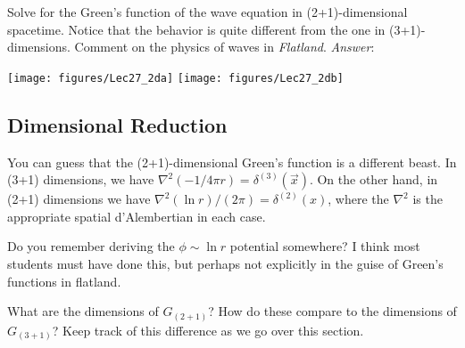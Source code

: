 \begin{exercise}
Solve for the Green's function of the wave equation in (2+1)-dimensional spacetime. Notice that the behavior is quite different from the one in (3+1)-dimensions. Comment on the physics of waves in \emph{Flatland}.
\emph{Answer}:
\begin{center}
\texttt{[image: figures/Lec27\_2da]}
\texttt{[image: figures/Lec27\_2db]}
\end{center}
\end{exercise}


\subsection{Dimensional Reduction}

You can guess that the (2+1)-dimensional Green's function is a different beast. In (3+1) dimensions, we have $\nabla^2 (-1/4\pi r) = \delta^{(3)}(\vec{x})$. On the other hand, in (2+1) dimensions we have $\nabla^2 (\ln r)/(2\pi) = \delta^{(2)}(x)$, where the $\nabla^2$ is the appropriate spatial d'Alembertian in each case.

\begin{exercise}
Do you remember deriving the $\phi\sim \ln r$ potential somewhere? I think most students must have done this, but perhaps not explicitly in the guise of Green's functions in flatland.
\end{exercise}

\begin{exercise}
What are the dimensions of $G_{(2+1)}$? How do these compare to the dimensions of $G_{(3+1)}$? Keep track of this difference as we go over this section.
\end{exercise}


